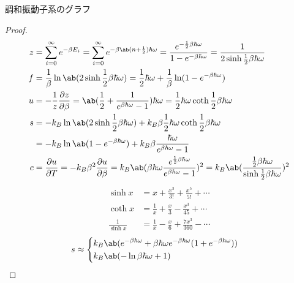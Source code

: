 \documentclass[a4paper,11pt]{jlreq}
\begin{document}
\begin{theorem}
  調和振動子系のグラフ
\end{theorem}
\begin{proof}
  \begin{align}
    z & = \sum_{i = 0}^{\infty}e^{-\beta E_i} = \sum_{i = 0}^{\infty}e^{-\beta\ab(n + \frac{1}{2})\hbar\omega} = \frac{e^{-\frac{1}{2}\beta\hbar\omega}}{1 - e^{-\beta\hbar\omega}} = \frac{1}{2\sinh \frac{1}{2}\beta\hbar\omega} \\
    f & = \frac{1}{\beta}\ln\ab(2\sinh \frac{1}{2}\beta\hbar\omega) = \frac{1}{2}\hbar\omega + \frac{1}{\beta}\ln(1 - e^{-\beta\hbar\omega})                                                                                       \\
    u & = -\frac{1}{z}\diffp{z}{\beta} = \ab(\frac{1}{2} + \frac{1}{e^{\beta\hbar\omega} - 1})\hbar\omega = \frac{1}{2}\hbar\omega\coth\frac{1}{2}\beta\hbar\omega                                                                 \\
    s & = -k_B\ln\ab(2\sinh \frac{1}{2}\beta\hbar\omega) + k_B\beta\frac{1}{2}\hbar\omega\coth \frac{1}{2}\beta\hbar\omega                                                                                                         \\
      & = - k_B\ln\ab(1 - e^{-\beta\hbar\omega}) + k_B\beta\frac{\hbar\omega}{e^{\beta\hbar\omega} - 1}                                                                                                                            \\
    c & = \diffp{u}{T} = -k_B\beta^2\diffp{u}{\beta} = k_B\ab(\beta\hbar\omega\frac{e^{\frac{1}{2}\beta\hbar\omega}}{e^{\beta\hbar\omega} - 1})^2 = k_B\ab(\frac{\frac{1}{2}\beta\hbar\omega}{\sinh\frac{1}{2}\beta\hbar\omega})^2
  \end{align}
  \begin{align}
    \sinh x           & = x + \frac{x^3}{3!} + \frac{x^5}{5!} + \cdots          \\
    \coth x           & = \frac{1}{x} + \frac{x}{3} - \frac{x^3}{45} + \cdots   \\
    \frac{1}{\sinh x} & = \frac{1}{x} - \frac{x}{6} + \frac{7x^3}{360} - \cdots
  \end{align}
  \begin{align}
    s & \approx \begin{dcases}
                  k_B\ab(e^{-\beta\hbar\omega} + \beta\hbar\omega e^{-\beta\hbar\omega}(1 + e^{-\beta\hbar\omega})) \\
                  k_B\ab(-\ln\beta\hbar\omega + 1)                                                                  \\

\end{dcases}
\end{align}
\end{proof}
\end{document}
